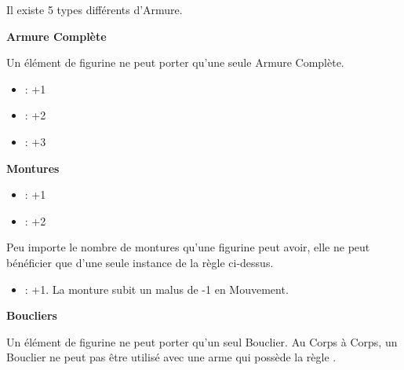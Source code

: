 Il existe 5 types différents d'Armure.

\begin{multicols}{2}
\vspace{3.25ex plus 1ex minus .2ex}
\begin{center}\noindent\textbf{Armure Complète}\end{center}
\vspace{1.5ex plus .2ex}

Un élément de figurine ne peut porter qu'une seule Armure Complète.

\noindent\begin{itemize}[label={-}, topsep=0cm, itemsep=0pt]
\item \la{} : +1
\item \ha{} : +2
\item \platearmour{} : +3
\end{itemize}

\vspace{3.25ex plus 1ex minus .2ex}
\begin{center}\noindent\textbf{Montures}\end{center}
\vspace{1.5ex plus .2ex}

\noindent\begin{itemize}[label={-}, topsep=0cm, itemsep=0pt]
\item {} : +1
\item {} : +2
\end{itemize}

Peu importe le nombre de montures qu'une figurine peut avoir, elle ne peut bénéficier que d'une seule instance de la règle ci-dessus.

\noindent\begin{itemize}[label={-}, topsep=0cm, itemsep=0pt]
\item \barding{} : +1. La monture subit un malus de -1 en Mouvement.
\end{itemize}

\columnbreak

\vspace{3.25ex plus 1ex minus .2ex}
\begin{center}\noindent\textbf{Boucliers}\end{center}
\vspace{1.5ex plus .2ex}

Un élément de figurine ne peut porter qu'un seul Bouclier. Au Corps à Corps, un Bouclier ne peut pas être utilisé avec une arme qui possède la règle \requirestwohands{}.


\end{multicols}
